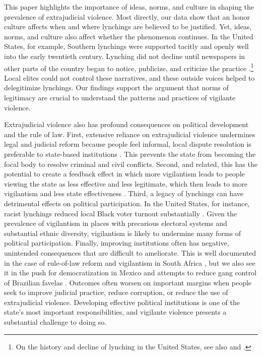 \documentclass[12pt,a4paper]{article}
\begin{document}
This paper highlights the importance of ideas, norms, and culture in shaping the prevalence of extrajudicial violence. Most directly, our data show that an honor culture affects when and where lynchings are believed to be justified. Yet, ideas, norms, and culture also affect whether the phenomenon continues. In the United States, for example, Southern lynchings were supported tacitly and openly well into the early twentieth century. Lynching did not decline until newspapers in other parts of the country began to notice, publicize, and criticize the practice \citep{weaver2019judge}.\footnote{On the history and decline of lynching in the United States, see also \citet{wood2011lynching} and \citet{rushdy2012american}.} Local elites could not control these narratives, and these outside voices helped to delegitimize lynchings. Our findings support the argument that norms of legitimacy are crucial to understand the patterns and practices of vigilante violence.

Extrajudicial violence also has profound consequences on political development and the rule of law. First, extensive reliance on extrajudicial violence undermines legal and judicial reform because people feel informal, local dispute resolution is preferable to state-based institutions \citep{blair2020peacekeeping}. This prevents the state from becoming the focal body to resolve criminal and civil conflicts. Second, and related, this has the potential to create a feedback effect in which more vigilantism leads to people viewing the state as less effective and less legitimate, which then leads to more vigilantism and less state effectiveness \citep{jung2020lynching}. Third, a legacy of lynchings can have detrimental effects on political participation. In the United States, for instance, racist lynchings reduced local Black voter turnout substantially \citep{jones2017political}. Given the prevalence of vigilantism in places with precarious electoral systems and substantial ethnic diversity, vigilantism is likely to undermine many forms of political participation. Finally, improving institutions often has negative, unintended consequences that are difficult to ameliorate. This is well documented in the case of rule-of-law reform and vigilantism in South Africa \citep{smith2019contradictions}, but we also see it in the push for democratization in Mexico \citep{trejo2021high} and attempts to reduce gang control of Brazilian favelas \citep{magaloni2020killing}. Outcomes often worsen on important margins when people seek to improve judicial practice, reduce corruption, or reduce the use of extrajudicial violence. 
Developing effective political institutions is one of the state's most important responsibilities, and vigilante violence presents a substantial challenge to doing so. 

\newpage

\setlength{\parindent}{0cm}
\setlength{\parskip}{5pt}


\end{document}
